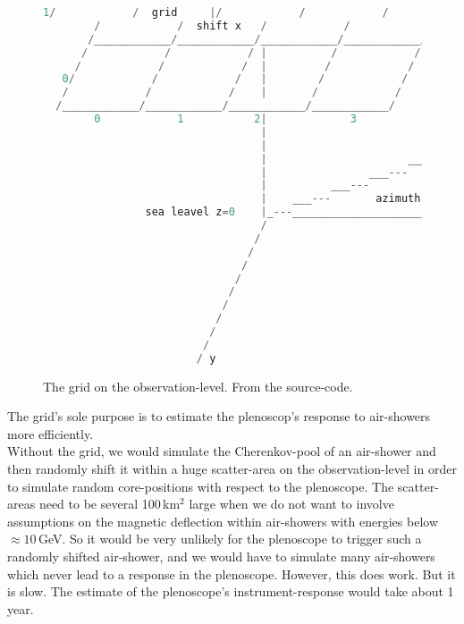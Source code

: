 \documentclass[a4paper,12pt,oneside]{article}
\begin{document}
\begin{figure}
\begin{lstlisting}[language=C,basicstyle=\tiny\ttfamily]
        1/            /  grid     |/            /            /             |
        /            /  shift x   /            /            /              |
       /____________/____________/____________/____________/               |
      /            /            / |          /            /                |
     /            /            /  |         /            /                 |
   0/            /            /   |        /            /                  |
   /            /            /    |       /            /                   |
  /____________/____________/____________/____________/                    |
        0            1           2|             3                          |
                                  |                                  ___---O
                                  |                            ___---
                                  |                      ___--- |
                                  |                ___---        |
                                  |          ___---               |
                                  |    ___---       azimuth       |
                sea leavel z=0    |_---__________________________/______ x
                                  /
                                 /
                                /
                               /
                              /
                             /
                            /
                           /
                          /
                         /
                        / y
\end{lstlisting}
\caption{The grid on the observation-level. From the source-code.}
\label{FigGridCoordinates}
\end{figure}
%
The grid's sole purpose is to estimate the plenoscop's response to air-showers more efficiently.\\
%
Without the grid, we would simulate the Cherenkov-pool of an air-shower and then randomly shift it within a huge scatter-area on the observation-level in order to simulate random core-positions with respect to the plenoscope.
%
The scatter-areas need to be several 100\,km$^2$ large when we do not want to involve assumptions on the magnetic deflection within air-showers with energies below $\approx 10\,$GeV.
%
So it would be very unlikely for the plenoscope to trigger such a randomly shifted air-shower, and we would have to simulate many air-showers which never lead to a response in the plenoscope.
%
However, this does work.
%
But it is slow.
%
The estimate of the plenoscope's instrument-response would take about 1\,year.\\
\end{document}
